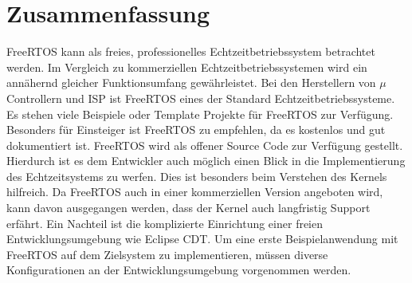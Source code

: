 \section{Zusammenfassung}
FreeRTOS kann als freies, professionelles Echtzeitbetriebssystem betrachtet werden. Im Vergleich zu kommerziellen Echtzeitbetriebssystemen wird ein annähernd gleicher Funktionsumfang gewährleistet. Bei den Herstellern von $\mu$Controllern und ISP ist FreeRTOS eines der Standard Echtzeitbetriebssysteme. Es stehen viele Beispiele oder Template Projekte für FreeRTOS zur Verfügung.  Besonders für Einsteiger ist FreeRTOS zu empfehlen, da es kostenlos und gut dokumentiert ist. FreeRTOS wird als offener Source Code zur Verfügung gestellt. Hierdurch ist es dem Entwickler auch möglich einen Blick in die Implementierung des Echtzeitsystems zu werfen. Dies ist besonders beim Verstehen des Kernels hilfreich. Da FreeRTOS auch in einer kommerziellen Version angeboten wird, kann davon ausgegangen werden, dass der Kernel auch langfristig Support erfährt. Ein Nachteil ist die komplizierte Einrichtung einer freien Entwicklungsumgebung wie Eclipse CDT. Um eine erste Beispielanwendung mit FreeRTOS auf dem Zielsystem zu implementieren, müssen diverse Konfigurationen an der Entwicklungsumgebung vorgenommen werden.
